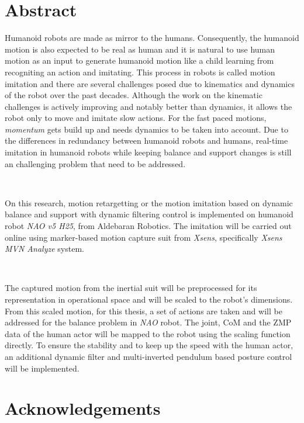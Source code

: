 \documentclass{thesisreport}
\begin{document}
   
 
  \section*{Abstract}
   
  Humanoid robots are made as mirror to the humans. Consequently, the humanoid motion is also expected to be real as 
  human and it is natural to use human motion as an input to generate humanoid motion like a child learning from recogniting
  an action and imitating. This process in robots is called motion imitation and there are several challenges posed 
  due to kinematics and dynamics of the robot over the past decades. Although the work on the kinematic challenges is 
  actively improving and notably better than dynamics, it allows the robot only to move and imitate slow actions. 
  For the fast paced motions, \textit{momentum} gets build up and needs dynamics to be taken into account. Due to the 
  differences in redundancy between humanoid robots and humans, real-time imitation in humanoid robots while keeping 
  balance and support changes is still an challenging problem that need to be addressed.

  ~
  
  On this research, motion retargetting or the motion imitation based on dynamic balance and support with dynamic filtering 
  control is implemented on humanoid robot \textit{NAO v5 H25}, from Aldebaran Robotics. The imitation will be carried out 
  online using marker-based motion capture suit from \textit{Xsens}, specifically \textit{Xsens MVN Analyze} system.
  
  ~
  
  The captured motion from the inertial suit will be preprocessed for its representation in operational space and will be 
  scaled to the robot's dimensions. From this scaled motion, for this thesis, a set of actions are taken and will be addressed
  for the balance problem in \textit{NAO} robot. The joint, CoM and the ZMP data of the human actor will be mapped to the robot
  using the scaling function directly. To ensure the stability and to keep up the speed with the human actor, an additional 
  dynamic filter and multi-inverted pendulum based posture control will be implemented. 
 
 \newpage
 
 \section*{Acknowledgements}
 
\end{document}
